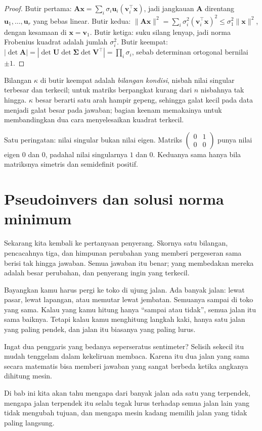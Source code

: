 \begin{proof}
Butir pertama: $\mathbf{A}\mathbf{x}=\sum_{i}\sigma_{i}\mathbf{u}_{i}
(\mathbf{v}_{i}^{\top}\mathbf{x})$, jadi jangkauan $\mathbf{A}$ direntang
$\mathbf{u}_{1},\dots,\mathbf{u}_{r}$ yang bebas linear. Butir kedua:
$\|\mathbf{A}\mathbf{x}\|^{2}=\sum_{i}\sigma_{i}^{2}(\mathbf{v}_{i}^{\top}\mathbf{x})^{2}
\le\sigma_{1}^{2}\|\mathbf{x}\|^{2}$, dengan kesamaan di $\mathbf{x}=\mathbf{v}_{1}$.
Butir ketiga: suku silang lenyap, jadi norma Frobenius kuadrat adalah jumlah
$\sigma_{i}^{2}$. Butir keempat: $|\det\mathbf{A}|=|\det\mathbf{U}\det\boldsymbol{\Sigma}
\det\mathbf{V}^{\top}|=\prod_{i}\sigma_{i}$, sebab determinan ortogonal bernilai $\pm1$.
\end{proof}

Bilangan $\kappa$ di butir keempat adalah \emph{bilangan kondisi}, nisbah nilai singular
terbesar dan terkecil; untuk matriks berpangkat kurang dari $n$ nisbahnya tak hingga.
$\kappa$ besar berarti satu arah hampir gepeng, sehingga galat kecil pada data menjadi
galat besar pada jawaban; bagian keenam memakainya untuk membandingkan dua cara
menyelesaikan kuadrat terkecil.

Satu peringatan: nilai singular bukan nilai eigen. Matriks
$\begin{pmatrix}0&1\\0&0\end{pmatrix}$ punya nilai eigen $0$ dan $0$, padahal nilai
singularnya $1$ dan $0$. Keduanya sama hanya bila matriksnya simetris dan semidefinit
positif.

\section{Pseudoinvers dan solusi norma minimum}

Sekarang kita kembali ke pertanyaan penyerang. Skornya satu bilangan, pencacahnya tiga,
dan himpunan perubahan yang memberi pergeseran sama berisi tak hingga jawaban. Semua
jawaban itu benar; yang membedakan mereka adalah besar perubahan, dan penyerang ingin
yang terkecil.

\begin{untukanak}
Bayangkan kamu harus pergi ke toko di ujung jalan. Ada banyak jalan: lewat pasar, lewat
lapangan, atau memutar lewat jembatan. Semuanya sampai di toko yang sama. Kalau yang
kamu hitung hanya ``sampai atau tidak'', semua jalan itu sama baiknya. Tetapi kalau kamu
menghitung langkah kaki, hanya satu jalan yang paling pendek, dan jalan itu biasanya
yang paling lurus.

Ingat dua penggaris yang bedanya seperseratus sentimeter? Selisih sekecil itu mudah
tenggelam dalam kekeliruan membaca. Karena itu dua jalan yang sama secara matematis bisa
memberi jawaban yang sangat berbeda ketika angkanya dihitung mesin.

Di bab ini kita akan tahu mengapa dari banyak jalan ada satu yang terpendek, mengapa
jalan terpendek itu selalu tegak lurus terhadap semua jalan lain yang tidak mengubah
tujuan, dan mengapa mesin kadang memilih jalan yang tidak paling langsung.
\end{untukanak}

